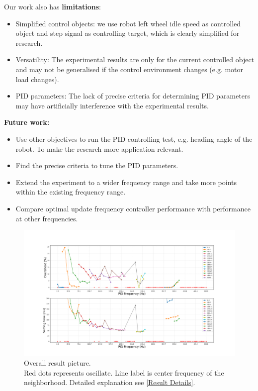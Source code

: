 \documentclass[conference]{IEEEtran}
\begin{document}
Our work also has \textbf{limitations}:
\begin{itemize}
    \item Simplified control objects: we use robot left wheel idle speed as controlled object and step signal as controlling target, which is clearly simplified for research.
    \item Versatility: The experimental results are only for the current controlled object and may not be generalised if the control environment changes (e.g. motor load changes).
    \item PID parameters: The lack of precise criteria for determining PID parameters may have artificially interference with the experimental results.
\end{itemize}

\textbf{Future work:}
\begin{itemize}
    \item Use other objectives to run the PID controlling test, e.g. heading angle of the robot. To make the research more application relevant.
    \item Find the precise criteria to tune the PID parameters.
    \item Extend the experiment to a wider frequency range and take more points within the existing frequency range.
    \item Compare optimal update frequency controller performance with performance at other frequencies.
\end{itemize}



 


\newpage
\onecolumn
\appendix
\begin{figure}[htbp]
\centerline{\includegraphics[width=1.3\linewidth]{Report/Pic/Appendix.png}}
\caption{Overall result picture.  \protect\\ Red dots represents oscillate. Line label is center frequency of the neighborhood.  Detailed explanation see \ref{Result Details}.}%
\label{fig_appendix}
\end{figure}
\end{document}

